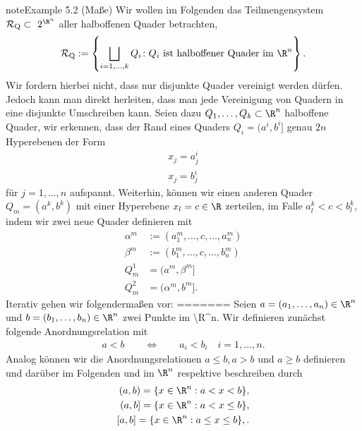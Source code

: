 \documentclass[letterpaper,10pt,english]{jupyterBook}
\begin{document}
\begin{sphinxadmonition}{note}{Example 5.2 (Maße)}
\sphinxAtStartPar
Wir wollen im Folgenden das Teilmengensystem \(\mathcal{R}_{\text{Q}}\subset\ 2^{\R^n}\) aller halboffenen Quader betrachten,
\begin{equation*}
\begin{split}\mathcal{R}_{\text{Q}} := \left\{ \bigsqcup_{i=1,\ldots,k} Q_i \colon Q_i \text{ ist halboffener Quader im } \R^n \right\}.\end{split}
\end{equation*}
\sphinxAtStartPar
Wir fordern hierbei nicht, dass nur disjunkte Quader vereinigt werden dürfen. Jedoch kann man direkt herleiten, dass man jede Vereinigung von Quadern in eine disjunkte Umschreiben kann. Seien dazu \(Q_1,\ldots,Q_k\subset\R^n\) halboffene Quader, wir erkennen, dass der Rand eines Quaders \(Q_i=(a^i,b^i]\) genau \(2n\) Hyperebenen der Form
\begin{equation*}
\begin{split}x_j = a^i_j\\
x_j = b^i_j\end{split}
\end{equation*}
\sphinxAtStartPar
für \(j=1,\ldots,n\) aufspannt. Weiterhin, können wir einen anderen Quader \(Q_m=(a^k,b^k)\) mit einer Hyperebene \(x_l=c\in\R\) zerteilen, im Falle \(a^k_l < c < b^k_l\), indem wir zwei neue Quader definieren mit
\begin{equation*}
\begin{split}\alpha^m&:=(a^m_1,\ldots,c,\ldots,a^m_n)\\
\beta^m&:=(b^m_1,\ldots,c,\ldots,b^m_n)\\
Q_m^1&=(a^m,\beta^m]\\
Q_m^2&=(\alpha^m,b^m].\end{split}
\end{equation*}
\sphinxAtStartPar
Iterativ gehen wir folgendermaßen vor:
=======
Seien \(a = (a_1,\ldots,a_n) \in \R^n\) und \(b = (b_1,\ldots,b_n) \in \R^n\) zwei Punkte im \textbackslash{}R\textasciicircum{}n.
Wir definieren zunächst folgende Anordnungsrelation mit
\begin{equation*}
\begin{split}a < b \qquad \Leftrightarrow \qquad a_i < b_i \quad i=1,\ldots,n.\end{split}
\end{equation*}
\sphinxAtStartPar
Analog können wir die Anordnungsrelationen \(a \leq b, a > b\) und \(a \geq b\) definieren und darüber im Folgenden  und  im \(\R^n\) respektive beschreiben durch
\begin{equation*}
\begin{split}(a,b) = \lbrace x \in \R^n : a < x < b \rbrace,\\
(a,b] = \lbrace x \in \R^n : a < x \leq b \rbrace,\\
[a,b] = \lbrace x \in \R^n : a \leq x \leq b \rbrace,.\end{split}
\end{equation*}\end{sphinxadmonition}
\end{document}
